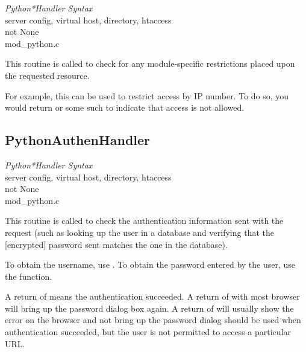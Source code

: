 \emph{Python*Handler Syntax}\\
server config, virtual host, directory, htaccess\\
not None\\
mod_python.c

This routine is called to check for any module-specific restrictions
placed upon the requested resource.

For example, this can be used to restrict access by IP number. To do
so, you would return  or some such to indicate
that access is not allowed.

\subsection{PythonAuthenHandler\label{dir-handlers-auh}}

\emph{Python*Handler Syntax}\\
server config, virtual host, directory, htaccess\\
not None\\
mod_python.c

This routine is called to check the authentication information sent
with the request (such as looking up the user in a database and
verifying that the [encrypted] password sent matches the one in the
database).

To obtain the username, use . To obtain the
password entered by the user, use the 
function.

A return of  means the authentication succeeded. A
return of  with most browser will bring
up the password dialog box again. A return of
 will usually show the error on the
browser and not bring up the password dialog
 should be used when authentication
succeeded, but the user is not permitted to access a particular URL.

